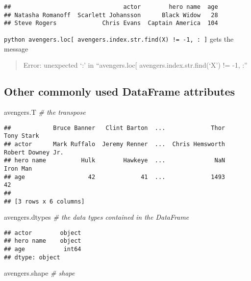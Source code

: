 \documentclass[
]{book}
\newenvironment{Shaded}{\begin{snugshade}}{\end{snugshade}}
\newcommand{\CommentTok}[1]{\textcolor[rgb]{0.56,0.35,0.01}{\textit{#1}}}
\newcommand{\NormalTok}[1]{#1}
\begin{document}
\begin{verbatim}
##                                actor        hero name  age
## Natasha Romanoff  Scarlett Johansson      Black Widow   28
## Steve Rogers             Chris Evans  Captain America  104
\end{verbatim}

\texttt{python\ avengers.loc{[}\ avengers.index.str.find(\textquotesingle{}X\textquotesingle{})\ !=\ -1,\ :\ {]}} gets the message

\begin{quote}
Error: unexpected `:' in ``avengers.loc{[} avengers.index.str.find(`X') != -1, :''
\end{quote}

\hypertarget{other-commonly-used-dataframe-attributes}{%
\subsection{Other commonly used DataFrame attributes}\label{other-commonly-used-dataframe-attributes}}

\begin{Shaded}
\begin{Highlighting}[]
\NormalTok{avengers.T }\CommentTok{\# the transpose}
\end{Highlighting}
\end{Shaded}

\begin{verbatim}
##            Bruce Banner   Clint Barton  ...             Thor         Tony Stark
## actor      Mark Ruffalo  Jeremy Renner  ...  Chris Hemsworth  Robert Downey Jr.
## hero name          Hulk        Hawkeye  ...              NaN           Iron Man
## age                  42             41  ...             1493                 42
## 
## [3 rows x 6 columns]
\end{verbatim}

\begin{Shaded}
\begin{Highlighting}[]
\NormalTok{avengers.dtypes }\CommentTok{\# the data types contained in the DataFrame}
\end{Highlighting}
\end{Shaded}

\begin{verbatim}
## actor        object
## hero name    object
## age           int64
## dtype: object
\end{verbatim}

\begin{Shaded}
\begin{Highlighting}[]
\NormalTok{avengers.shape }\CommentTok{\# shape}
\end{Highlighting}
\end{Shaded}
\end{document}
